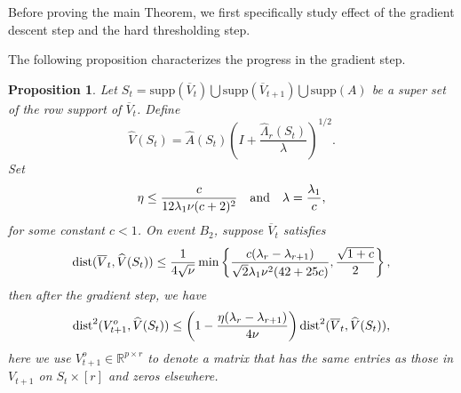 \documentclass[11pt]{article}
\newcommand{\nb}[1]{\textcolor{orange}{\texttt{[#1]}}}
\newcommand{\rev}[1]{\textcolor{black}{#1}}
\newcommand{\hU}{\widehat{V}}
\newcommand{\gd}{\overline{V}}
\newcommand{\0}{{\mathbf{0}}}
\newtheorem{proposition}[theorem]{Proposition}
\begin{document}
{

Before proving the main Theorem, we first specifically study effect of the gradient descent step and the hard thresholding step.



The following proposition characterizes the progress in the gradient step.
\begin{proposition}\label{prop: gradana}
Let $S_t=\mathrm{supp}(\gd_t)\bigcup \mathrm{supp}(\gd_{t+1})\bigcup \mathrm{supp}(A)$ be a super set of the row support of $\gd_t$. Define \begin{equation*}
    \widehat{V}(S_t)=\widehat{A}(S_t)\left(I+\frac{\widehat{\Lambda}_r(S_t)}{\lambda}\right)^{1/2}.
\end{equation*} 
Set \begin{equation}\label{tune}
    \eta \leq \frac{c}{12\lambda_1\rev{\nu}(c+2)^2}\quad \text{and}\quad \lambda = \frac{\lambda_1}{c},
\end{equation}
for some constant $c<1$.
On event $B_2$, suppose $\gd_t$ satisfies \begin{equation}\label{radius}
    \mathrm{dist}( \gd_t,\widehat{V}(S_t))\leq \frac{1}{4\sqrt{\rev{\nu}}}\min\left\{\frac{c(\lambda_r -\lambda_{r+1})}{\sqrt{2}\lambda_1\rev{\nu}^2(42+25c)},\frac{\sqrt{1+c}}{2}\right\},
\end{equation}
then after the gradient step, we have
 \begin{equation*}
    \mathrm{dist}^2(V_{t+1}^o, \hU(S_t))\leq\left(1-\frac{\eta(\lambda_r-\lambda_{r+1})}{4\rev{\nu}}\right)\mathrm{dist}^2(\gd_t,\hU(S_t)),
\end{equation*}
here we use $V_{t+1}^o \in\mathbb{R}^{p\times r}$ to denote a matrix that has the same entries as those in $V_{t+1}$ on $S_t\times [r]$ and zeros elsewhere. 


\end{proposition}}
\end{document}
